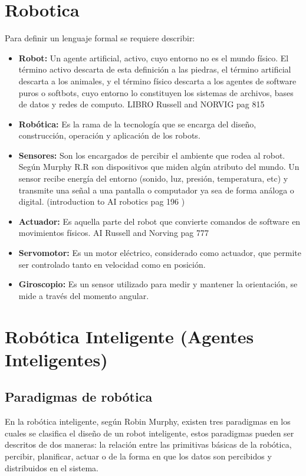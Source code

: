 \section{Robotica} \label{sect:robotica}
 
Para definir un lenguaje formal se requiere describir:
\begin{itemize}
\item{\textbf{Robot:} Un agente artificial, activo, cuyo entorno no es el mundo físico. El término activo descarta de esta definición a las piedras, el término artificial descarta a los animales, y el término físico descarta a los agentes de software puros o softbots, cuyo entorno lo constituyen los sistemas de archivos, bases de datos y redes de computo. LIBRO Russell and NORVIG pag 815}
\item{\textbf{Robótica:} Es la rama de la tecnología que se encarga del diseño, construcción, operación y aplicación de los robots.}
\item{\textbf{Sensores:}  Son los encargados de percibir el ambiente que rodea al robot. Según Murphy R.R son dispositivos que miden algún atributo del mundo. Un sensor recibe energía del entorno (sonido, luz, presión, temperatura, etc) y transmite una señal a una pantalla o computador ya sea de forma análoga o digital. (introduction to AI robotics pag 196 )}
\item{\textbf{Actuador:}  Es aquella parte del robot que convierte comandos de software en movimientos físicos. AI Russell and Norving pag 777}
\item{\textbf{Servomotor:}  Es un motor eléctrico, considerado como actuador, que permite ser controlado tanto en velocidad como en posición. }
\item{\textbf{Giroscopio:} Es un sensor utilizado para medir y mantener la orientación, se mide a través del momento angular.}
\end{itemize}

\section{Robótica Inteligente (Agentes Inteligentes)} \label{sect:AgentesInteligentes}
\subsection{Paradigmas de robótica}
En la robótica inteligente, según Robin Murphy, existen tres paradigmas en los cuales se clasifica el diseño de un robot inteligente, estos paradigmas pueden ser descritos de dos maneras: la relación entre las primitivas básicas de la robótica, percibir, planificar, actuar o de la forma en que los datos son percibidos y distribuidos en el sistema.

